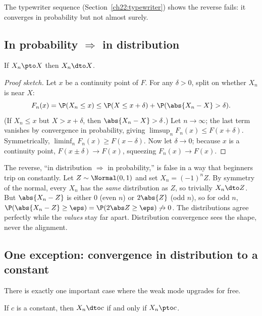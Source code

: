The typewriter sequence (Section~\ref{ch22:typewriter}) shows the reverse fails: it
converges in probability but not almost surely.

\subsection{In probability \texorpdfstring{$\Rightarrow$}{=>} in distribution}
\label{ch22:p-imp-d}

\begin{theorem}
\label{ch22:thm-p-d}
If $X_n\pto X$ then $X_n\dto X$.
\end{theorem}

\begin{proof}[Proof sketch]
Let $x$ be a continuity point of $F$. For any $\delta>0$, split on whether $X_n$ is
near $X$:
\[
  F_n(x)=\P(X_n\le x)
  \le \P(X\le x+\delta) + \P(\abs{X_n - X} > \delta).
\]
(If $X_n\le x$ but $X>x+\delta$, then $\abs{X_n-X}>\delta$.) Let $n\to\infty$; the
last term vanishes by convergence in probability, giving $\limsup_n F_n(x)\le
F(x+\delta)$. Symmetrically, $\liminf_n F_n(x)\ge F(x-\delta)$. Now let $\delta\to0$;
because $x$ is a continuity point, $F(x\pm\delta)\to F(x)$, squeezing $F_n(x)\to
F(x)$.
\end{proof}

\begin{trapbox}
The reverse, ``in distribution $\Rightarrow$ in probability,'' is false in a way that
beginners trip on constantly. Let $Z\sim\Normal(0,1)$ and set $X_n = (-1)^n Z$. By
symmetry of the normal, every $X_n$ has the \emph{same} distribution as $Z$, so
trivially $X_n\dto Z$. But $\abs{X_n - Z}$ is either $0$ (even $n$) or $2\abs{Z}$
(odd $n$), so for odd $n$, $\P(\abs{X_n - Z}\ge\eps)=\P(2\abs Z\ge\eps)\not\to0$. The
distributions agree perfectly while the \emph{values} stay far apart. Distribution
convergence sees the shape, never the alignment.
\end{trapbox}

\subsection{One exception: convergence in distribution to a constant}
\label{ch22:to-constant}

There is exactly one important case where the weak mode upgrades for free.

\begin{theorem}
\label{ch22:thm-const}
If $c$ is a constant, then $X_n\dto c$ if and only if $X_n\pto c$.
\end{theorem}

